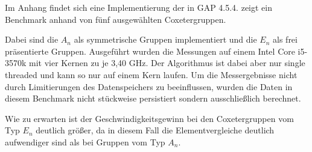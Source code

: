 Im Anhang findet sich eine Implementierung der 
in GAP 4.5.4.  zeigt ein Benchmark anhand von fünf
ausgewählten Coxetergruppen.

Dabei sind die $A_n$ als
symmetrische Gruppen implementiert und die $E_n$ als frei präsentierte Gruppen.
Ausgeführt wurden die Messungen auf einem Intel Core i5-3570k mit vier Kernen
zu je 3,40 GHz. Der Algorithmus ist dabei aber nur single threaded und kann so
nur auf einem Kern laufen. Um die Messergebnisse nicht durch Limitierungen des
Datenspeichers zu beeinflussen, wurden die Daten in diesem Benchmark nicht
stückweise persistiert sondern ausschließlich berechnet.

Wie zu erwarten ist der Geschwindigkeitsgewinn bei den Coxetergruppen vom Typ
$E_n$ deutlich größer, da in diesem Fall die Elementvergleiche deutlich
aufwendiger sind als bei Gruppen vom Typ $A_n$.